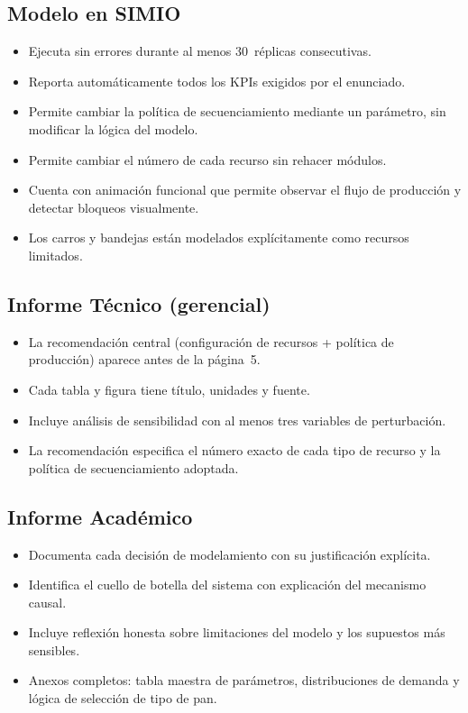 \documentclass[12pt]{article}
\begin{document}
\subsection{Modelo en SIMIO}
\begin{itemize}
  \item Ejecuta sin errores durante al menos 30~réplicas consecutivas.
  \item Reporta automáticamente todos los KPIs exigidos por el enunciado.
  \item Permite cambiar la política de secuenciamiento mediante un parámetro, sin modificar la lógica del modelo.
  \item Permite cambiar el número de cada recurso sin rehacer módulos.
  \item Cuenta con animación funcional que permite observar el flujo de producción y detectar bloqueos visualmente.
  \item Los carros y bandejas están modelados explícitamente como recursos limitados.
\end{itemize}

\subsection{Informe Técnico (gerencial)}
\begin{itemize}
  \item La recomendación central (configuración de recursos + política de producción) aparece antes de la página~5.
  \item Cada tabla y figura tiene título, unidades y fuente.
  \item Incluye análisis de sensibilidad con al menos tres variables de perturbación.
  \item La recomendación especifica el número exacto de cada tipo de recurso y la política de secuenciamiento adoptada.
\end{itemize}

\subsection{Informe Académico}
\begin{itemize}
  \item Documenta cada decisión de modelamiento con su justificación explícita.
  \item Identifica el cuello de botella del sistema con explicación del mecanismo causal.
  \item Incluye reflexión honesta sobre limitaciones del modelo y los supuestos más sensibles.
  \item Anexos completos: tabla maestra de parámetros, distribuciones de demanda y lógica de selección de tipo de pan.
\end{itemize}
\end{document}
